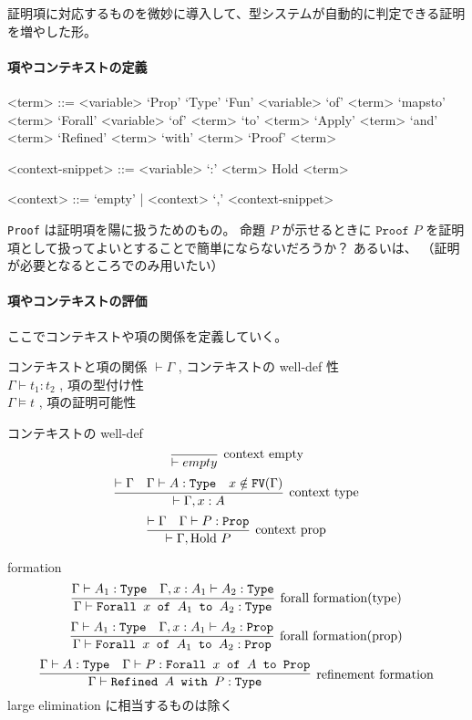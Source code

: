 証明項に対応するものを微妙に導入して、型システムが自動的に判定できる証明を増やした形。

\paragraph*{項やコンテキストの定義}
\begin{grammar}
<term> ::= <variable> 
\alt `Prop'
\alt `Type'
\alt `Fun' <variable> `of' <term> `mapsto' <term>
\alt `Forall' <variable> `of' <term> `to' <term>
\alt `Apply' <term> `and' <term>
\alt `Refined' <term> `with' <term>
\alt `Proof' <term>

<context-snippet> ::= <variable> `:' <term>
\alt Hold <term>

<context> ::= `empty' | <context> `,' <context-snippet>
\end{grammar}

\texttt{Proof} は証明項を陽に扱うためのもの。
命題 \(P\) が示せるときに \(\texttt{Proof } P\) を証明項として扱ってよいとすることで簡単にならないだろうか？
あるいは、
（証明が必要となるところでのみ用いたい）

\paragraph*{項やコンテキストの評価}
ここでコンテキストや項の関係を定義していく。

\begin{itembox}[l]{コンテキストと項の関係}
  \(\vdash \Gamma\) , コンテキストの well-def 性 \\
  \(\Gamma \vdash t_1 : t_2\) , 項の型付け性 \\
  \(\Gamma \vDash t\) , 項の証明可能性 \\
\end{itembox}

\begin{itembox}[l]{コンテキストの well-def}
  \[\infer[\text{context empty}]{\vdash empty}{}\]
  \[\infer[\text{context type}]{\vdash \Gamma , x : A}{\vdash \Gamma & \Gamma \vdash A : \texttt{Type} & x \notin \texttt{FV}(\Gamma)}\]
  \[\infer[\text{context prop}]{\vdash \Gamma , \text{Hold } P}{\vdash \Gamma & \Gamma \vdash P : \texttt{Prop}}\]
\end{itembox}

\begin{itembox}[l]{formation}
  \[\infer[\text{forall formation(type)}]{\Gamma \vdash \texttt{Forall } x \texttt{ of } A_1 \texttt{ to } A_2 : \texttt{Type}}{\Gamma \vdash A_1 : \texttt{Type} & \Gamma , x : A_1 \vdash A_2 : \texttt{Type} }\]
  \[\infer[\text{forall formation(prop)}]{\Gamma \vdash \texttt{Forall } x \texttt{ of } A_1 \texttt{ to } A_2 : \texttt{Prop}}{\Gamma \vdash A_1 : \texttt{Type} & \Gamma , x : A_1 \vdash A_2 : \texttt{Prop} }\]
  \[\infer[\text{refinement formation}]{\Gamma \vdash \texttt{Refined } A \texttt{ with } P : \texttt{Type}}{\Gamma \vdash A : \texttt{Type} & \Gamma \vdash P : \texttt{Forall } x \texttt{ of } A \texttt{ to } \texttt{Prop}}\]
  large elimination に相当するものは除く
\end{itembox}

